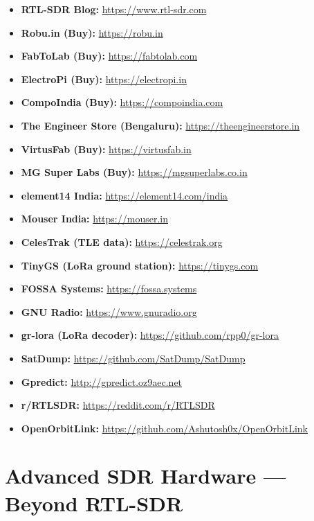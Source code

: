 \documentclass[12pt,a4paper]{article}
\begin{document}
\begin{itemize}
    \item \textbf{RTL-SDR Blog:} \url{https://www.rtl-sdr.com}
    \item \textbf{Robu.in (Buy):} \url{https://robu.in}
    \item \textbf{FabToLab (Buy):} \url{https://fabtolab.com}
    \item \textbf{ElectroPi (Buy):} \url{https://electropi.in}
    \item \textbf{CompoIndia (Buy):} \url{https://compoindia.com}
    \item \textbf{The Engineer Store (Bengaluru):} \url{https://theengineerstore.in}
    \item \textbf{VirtusFab (Buy):} \url{https://virtusfab.in}
    \item \textbf{MG Super Labs (Buy):} \url{https://mgsuperlabs.co.in}
    \item \textbf{element14 India:} \url{https://element14.com/india}
    \item \textbf{Mouser India:} \url{https://mouser.in}
    \item \textbf{CelesTrak (TLE data):} \url{https://celestrak.org}
    \item \textbf{TinyGS (LoRa ground station):} \url{https://tinygs.com}
    \item \textbf{FOSSA Systems:} \url{https://fossa.systems}
    \item \textbf{GNU Radio:} \url{https://www.gnuradio.org}
    \item \textbf{gr-lora (LoRa decoder):} \url{https://github.com/rpp0/gr-lora}
    \item \textbf{SatDump:} \url{https://github.com/SatDump/SatDump}
    \item \textbf{Gpredict:} \url{http://gpredict.oz9aec.net}
    \item \textbf{r/RTLSDR:} \url{https://reddit.com/r/RTLSDR}
    \item \textbf{OpenOrbitLink:} \url{https://github.com/Ashutosh0x/OpenOrbitLink}
\end{itemize}

\section{Advanced SDR Hardware — Beyond RTL-SDR}
\end{document}
